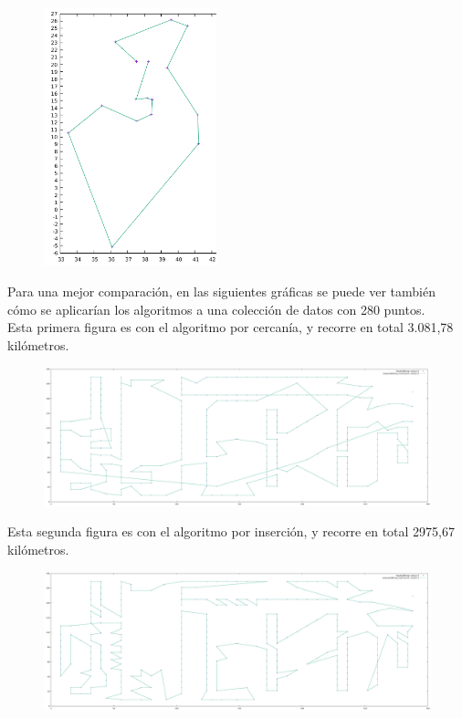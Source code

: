 \documentclass[11pt,a4paper]{article} %
\begin{document}
\begin{figure}[H]
	\centering
	\includegraphics[width=5cm]{data/graphics/comparacion/tsp_optimo.png}
\end{figure}
\vspace{0,7cm}

Para una mejor comparación, en las siguientes gráficas se puede ver también cómo se aplicarían los algoritmos a una colección de datos con 280 puntos.\\

Esta primera figura es con el algoritmo por cercanía, y recorre en total 3.081,78 kilómetros.
\begin{figure}[H]
	\centering
	\includegraphics[width=13cm]{data/graphics/cercania/cercania_280.pdf}
\end{figure}
\vspace{0,7cm}

Esta segunda figura es con el algoritmo por inserción, y recorre en total 2975,67 kilómetros.
\begin{figure}[H]
	\centering
	\includegraphics[width=13cm]{data/graphics/insercion/insercion_280.pdf}
\end{figure}
\vspace{0,7cm}
\end{document}
